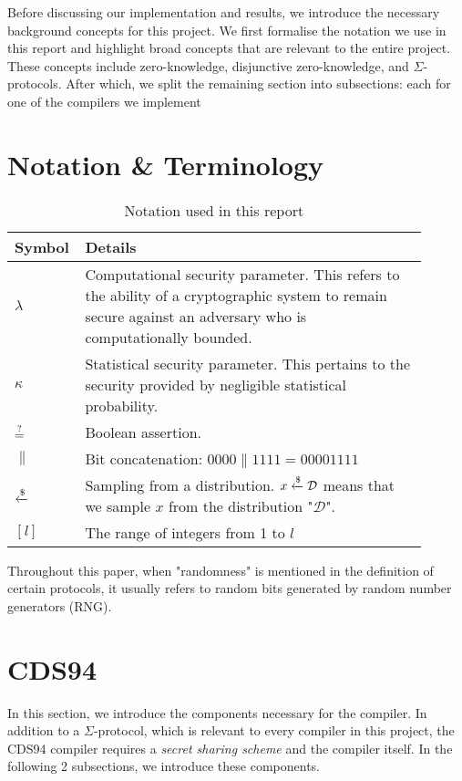 Before discussing our implementation and results, we introduce the necessary background concepts for this project. 
We first formalise the notation we use in this report and highlight broad concepts that are relevant to the entire project. 
These concepts include zero-knowledge, disjunctive zero-knowledge, and $\Sigma$-protocols. 
After which, we split the remaining section into subsections: 
each for one of the compilers we implement \cite{CDS94, StackingSigmas}%

\section{Notation \& Terminology}\label{sec:notation}
\begin{table}[h]
  \centering
  \label{tab:notation}
  \caption{Notation used in this report}
  \begin{tabular}{|A{0.1\linewidth}|M{0.8\linewidth}|}
    \hline
    Symbol & Details \\\hline
    $\lambda$ & Computational security parameter. This refers to the ability of a cryptographic system to remain secure against an adversary who is computationally bounded. \\\hline
    $\kappa$ & Statistical security parameter. This pertains to the security provided by negligible statistical probability. \\\hline
    $\overset {?} {=}$ & Boolean assertion. \\\hline
    $\|$ & Bit concatenation: $0000 \| 1111 = 00001111$ \\\hline
    $\xleftarrow{\$}$ & Sampling from a distribution. $x \xleftarrow{\$} \mathcal D$ means that we sample $x$ from 
    the distribution "$\mathcal D$". \\
    \hline
    $[l]$ & The range of integers from 1 to $l$ \\
    \hline
  \end{tabular}
\end{table}

Throughout this paper, when "randomness" is mentioned in the definition of certain protocols, it usually refers to random bits generated by random number generators (RNG).






\section{CDS94}
In this section, we introduce the components necessary for the \cite{CDS94} compiler. In addition to a $\Sigma$-protocol, which 
is relevant to every compiler in this project, the CDS94 compiler requires a \emph{secret sharing scheme} and the compiler 
itself. In the following 2 subsections, we introduce these components.



